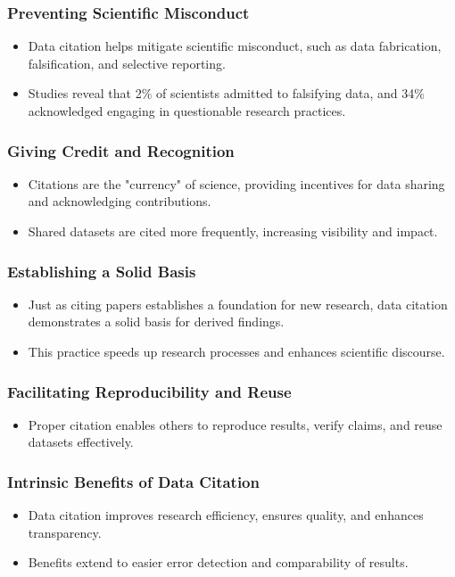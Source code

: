 \subsubsection{Preventing Scientific Misconduct}
\begin{itemize}
    \item Data citation helps mitigate scientific misconduct, such as data fabrication, falsification, and selective reporting.
    \item Studies reveal that 2\% of scientists admitted to falsifying data, and 34\% acknowledged engaging in questionable research practices.
\end{itemize}

\subsubsection{Giving Credit and Recognition}
\begin{itemize}
    \item Citations are the "currency" of science, providing incentives for data sharing and acknowledging contributions.
    \item Shared datasets are cited more frequently, increasing visibility and impact.
\end{itemize}

\subsubsection{Establishing a Solid Basis}
\begin{itemize}
    \item Just as citing papers establishes a foundation for new research, data citation demonstrates a solid basis for derived findings.
    \item This practice speeds up research processes and enhances scientific discourse.
\end{itemize}

\subsubsection{Facilitating Reproducibility and Reuse}
\begin{itemize}
    \item Proper citation enables others to reproduce results, verify claims, and reuse datasets effectively.
\end{itemize}

\subsubsection{Intrinsic Benefits of Data Citation}
\begin{itemize}
    \item Data citation improves research efficiency, ensures quality, and enhances transparency.
    \item Benefits extend to easier error detection and comparability of results.
\end{itemize}

